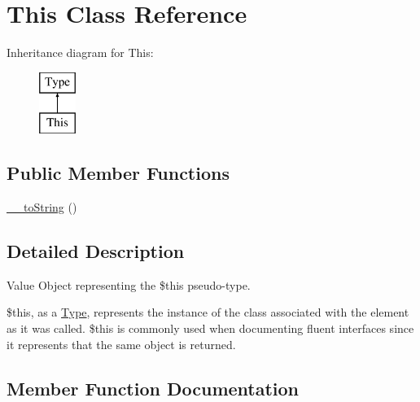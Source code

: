 \hypertarget{classphp_documentor_1_1_reflection_1_1_types_1_1_this}{}\section{This Class Reference}
\label{classphp_documentor_1_1_reflection_1_1_types_1_1_this}
Inheritance diagram for This\+:\begin{figure}[H]
\begin{center}
\leavevmode
\includegraphics[height=2.000000cm]{classphp_documentor_1_1_reflection_1_1_types_1_1_this}
\end{center}
\end{figure}
\subsection*{Public Member Functions}
\begin{DoxyCompactItemize}
\item 
\mbox{\hyperlink{classphp_documentor_1_1_reflection_1_1_types_1_1_this_a7516ca30af0db3cdbf9a7739b48ce91d}{\+\_\+\+\_\+to\+String}} ()
\end{DoxyCompactItemize}


\subsection{Detailed Description}
Value Object representing the \textquotesingle{}\$this\textquotesingle{} pseudo-\/type.

\$this, as a \mbox{\hyperlink{interfacephp_documentor_1_1_reflection_1_1_type}{Type}}, represents the instance of the class associated with the element as it was called. \$this is commonly used when documenting fluent interfaces since it represents that the same object is returned. 

\subsection{Member Function Documentation}
\mbox{\label{classphp_documentor_1_1_reflection_1_1_types_1_1_this_a7516ca30af0db3cdbf9a7739b48ce91d}} 
